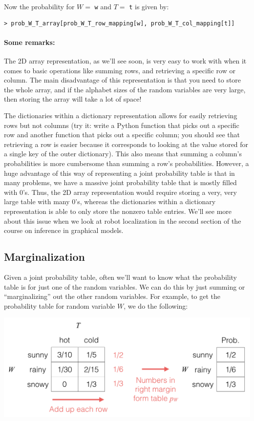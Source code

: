 \documentclass[6008notes.tex]{subfiles}
\begin{document}
Now the probability for $W =$ \texttt{w} and $T =$ \texttt{t} is given by:

\begin{lstlisting}
> prob_W_T_array[prob_W_T_row_mapping[w], prob_W_T_col_mapping[t]]
\end{lstlisting}

\paragraph{Some remarks:} The 2D array representation, as we'll see soon, is very easy to work with when it comes to basic operations like summing rows, and retrieving a specific row or column. The main disadvantage of this representation is that you need to store the whole array, and if the alphabet sizes of the random variables are very large, then storing the array will take a lot of space!

The dictionaries within a dictionary representation allows for easily retrieving rows but not columns (try it: write a Python function that picks out a specific row and another function that picks out a specific column; you should see that retrieving a row is easier because it corresponds to looking at the value stored for a single key of the outer dictionary). This also means that summing a column's probabilities is more cumbersome than summing a row's probabilities. However, a huge advantage of this way of representing a joint probability table is that in many problems, we have a massive joint probability table that is mostly filled with 0's. Thus, the 2D array representation would require storing a very, very large table with many 0's, whereas the dictionaries within a dictionary representation is able to only store the nonzero table entries. We'll see more about this issue when we look at robot localization in the second section of the course on inference in graphical models.

\subsection{Marginalization}

Given a joint probability table, often we'll want to know what the probability table is for just one of the random variables. We can do this by just summing or ``marginalizing'' out the other random variables. For example, to get the probability table for random variable $W$, we do the following:

{\centering\includegraphics[scale=0.4]{images_sec-joint-rv-marg-rows}}
\end{document}
